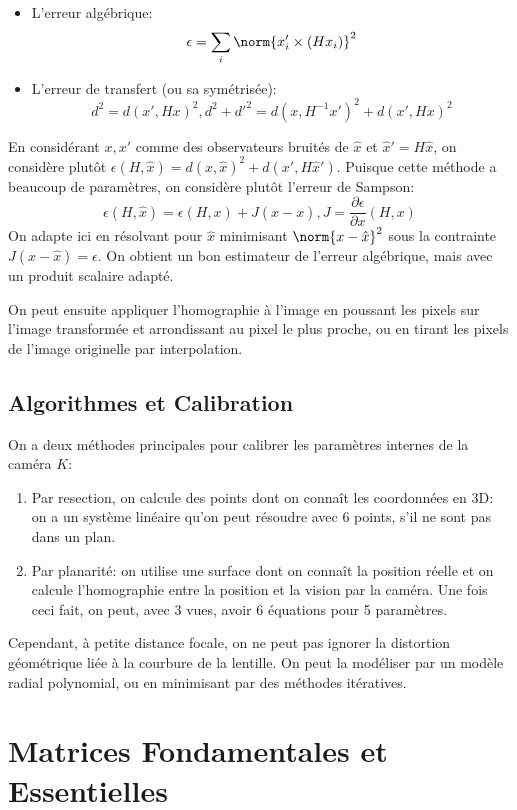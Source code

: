 \documentclass[info, math]{mpb-cours}
\begin{document}
\begin{itemize}
	\item L'erreur algébrique:
	      \begin{equation*}
		      \epsilon = \sum_{i} \norm{x_{i}' \times (Hx_{i})}^{2}
	      \end{equation*}
	\item L'erreur de transfert (ou sa symétrisée):
	      \begin{equation*}
		      d^{2} = d(x', Hx)^{2}, d^{2} + d'^{2} = d(x, H^{-1}x')^{2} + d(x', Hx)^{2}
	      \end{equation*}
\end{itemize}

En considérant $x, x'$ comme des observateurs bruités de $\hat{x}$ et $\hat{x}' = H\hat{x}$, on considère plutôt $\epsilon(H, \hat{x}) = d(x, \hat{x})^{2} + d(x', H\hat{x}')$.
Puisque cette méthode a beaucoup de paramètres, on considère plutôt l'erreur de Sampson:
\begin{equation*}
	\epsilon(H, \hat{x}) = \epsilon(H, x) + J(\hat{x} - x), J = \frac{\partial \epsilon}{\partial x}(H, x)
\end{equation*}
On adapte ici en résolvant pour $\hat{x}$ minimisant $\norm{x - \hat{x}}^{2}$ sous la contrainte $J(x - \hat{x}) = \epsilon$.
On obtient un bon estimateur de l'erreur algébrique, mais avec un produit scalaire adapté.

On peut ensuite appliquer l'homographie à l'image en poussant les pixels sur l'image transformée et arrondissant au pixel le plus proche, ou en tirant les pixels de l'image originelle par interpolation.


\subsection{Algorithmes et Calibration}
On a deux méthodes principales pour calibrer les paramètres internes de la caméra $K$:
\begin{enumerate}
  \item Par resection, on calcule des points dont on connaît les coordonnées en 3D: on a un système linéaire qu'on peut résoudre avec 6 points, s'il ne sont pas dans un plan.
  \item Par planarité: on utilise une surface dont on connaît la position réelle et on calcule l'homographie entre la position et la vision par la caméra.
    Une fois ceci fait, on peut, avec 3 vues, avoir 6 équations pour 5 paramètres.
\end{enumerate}

Cependant, à petite distance focale, on ne peut pas ignorer la distortion géométrique liée à la courbure de la lentille.
On peut la modéliser par un modèle radial polynomial, ou en minimisant par des méthodes itératives.

\section{Matrices Fondamentales et Essentielles}
\end{document}
